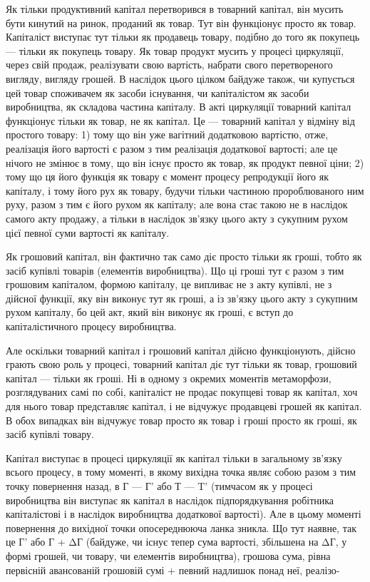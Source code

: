 Як тільки продуктивний капітал перетворився в товарний капітал,
він мусить бути кинутий на ринок, проданий як товар.
Тут він функціонує просто як товар. Капіталіст виступає тут
тільки як продавець товару, подібно до того як покупець —
тільки як покупець товару. Як товар продукт мусить у процесі
циркуляції, через свій продаж, реалізувати свою вартість, набрати
свого перетвореного вигляду, вигляду грошей. В наслідок
цього цілком байдуже також, чи купується цей товар споживачем
як засоби існування, чи капіталістом як засоби виробництва,
як складова частина капіталу. В акті циркуляції товарний
капітал функціонує тільки як товар, не як капітал. Це — товарний капітал у відміну від простого
товару: 1) тому що він
уже вагітний додатковою вартістю, отже, реалізація його вартості
є разом з тим реалізація додаткової вартості; але це нічого не
змінює в тому, що він існує просто як товар, як продукт певної
ціни; 2) тому що ця його функція як товару є момент процесу
репродукції його як капіталу, і тому його рух як товару,
будучи тільки частиною пророблюваного ним руху, разом з тим
є його рухом як капіталу; але вона стає такою не в наслідок
самого акту продажу, а тільки в наслідок зв’язку цього акту
з сукупним рухом цієї певної суми вартості як капіталу.

Як грошовий капітал, він фактично так само діє просто тільки
як гроші, тобто як засіб купівлі товарів (елементів виробництва).
Що ці гроші тут є разом з тим грошовим капіталом, формою капіталу,
це випливає не з акту купівлі, не з дійсної функції, яку
він виконує тут як гроші, а із зв’язку цього акту з сукупним
рухом капіталу, бо цей акт, який він виконує як гроші, є вступ
до капіталістичного процесу виробництва.

Але оскільки товарний капітал і грошовий капітал дійсно
функціонують, дійсно грають свою роль у процесі, товарний капітал
діє тут тільки як товар, грошовий капітал — тільки як гроші.
Ні в одному з окремих моментів метаморфози, розглядуваних самі
по собі, капіталіст не продає покупцеві товар як капітал, хоч
для нього товар представляє капітал, і не відчужує продавцеві
грошей як капітал. В обох випадках він відчужує товар
просто як товар і гроші просто як гроші, як засіб купівлі
товару.

Капітал виступає в процесі циркуляції як капітал тільки в
загальному зв’язку всього процесу, в тому моменті, в якому вихідна
точка являє собою разом з тим точку повернення назад, в Г — Г' або Т — T' (тимчасом як у процесі
виробництва він виступає як
капітал в наслідок підпорядкування робітника капіталістові і в
наслідок виробництва додаткової вартості). Але в цьому моменті
повернення до вихідної точки опосереднююча ланка зникла.
Що тут наявне, так це Г' або Г + ΔГ (байдуже, чи існує тепер
сума вартості, збільшена на ΔГ, у формі грошей, чи товару,
чи елементів виробництва), грошова сума, рівна первісній авансованій
грошовій сумі + певний надлишок понад неї, реалізо-
